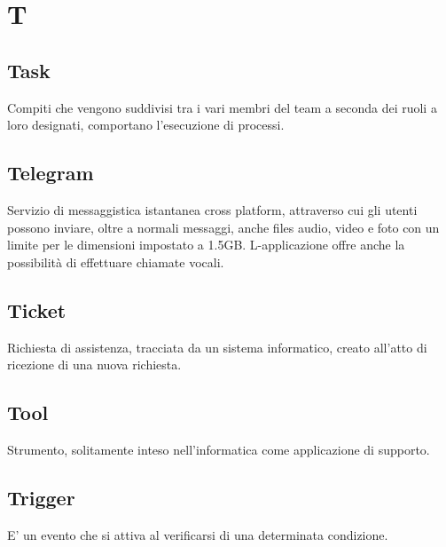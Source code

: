 \section*{T}

\subsection{Task}
Compiti che vengono suddivisi tra i vari membri del team a seconda dei ruoli a loro designati, comportano l'esecuzione di processi.

\subsection{Telegram}
Servizio di messaggistica istantanea cross platform, attraverso cui gli utenti possono inviare, oltre a normali messaggi, anche files audio, video e foto con un limite per le dimensioni impostato a 1.5GB. L-applicazione offre anche la possibilità di effettuare chiamate vocali.

\subsection{Ticket}
Richiesta di assistenza, tracciata da un sistema informatico, creato all'atto di ricezione di una nuova richiesta.

\subsection{Tool}
Strumento, solitamente inteso nell'informatica come applicazione di supporto.

\subsection{Trigger}
E' un evento che si attiva al verificarsi di una determinata condizione.


